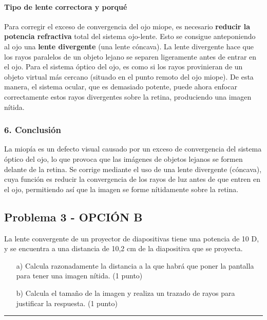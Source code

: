 \paragraph{Tipo de lente correctora y porqué}
Para corregir el exceso de convergencia del ojo miope, es necesario \textbf{reducir la potencia refractiva} total del sistema ojo-lente. Esto se consigue anteponiendo al ojo una \textbf{lente divergente} (una lente cóncava).
La lente divergente hace que los rayos paralelos de un objeto lejano se separen ligeramente antes de entrar en el ojo. Para el sistema óptico del ojo, es como si los rayos provinieran de un objeto virtual más cercano (situado en el punto remoto del ojo miope). De esta manera, el sistema ocular, que es demasiado potente, puede ahora enfocar correctamente estos rayos divergentes sobre la retina, produciendo una imagen nítida.

\subsubsection*{6. Conclusión}
\begin{cajaconclusion}
La miopía es un defecto visual causado por un exceso de convergencia del sistema óptico del ojo, lo que provoca que las imágenes de objetos lejanos se formen delante de la retina. Se corrige mediante el uso de una lente divergente (cóncava), cuya función es reducir la convergencia de los rayos de luz antes de que entren en el ojo, permitiendo así que la imagen se forme nítidamente sobre la retina.
\end{cajaconclusion}

\newpage

\subsection{Problema 3 - OPCIÓN B}
\label{subsec:3B_2018_jun_ord}
\begin{cajaenunciado}
La lente convergente de un proyector de diapositivas tiene una potencia de 10 D, y se encuentra a una distancia de 10,2 cm de la diapositiva que se proyecta.
\begin{itemize}
    \item[a)] Calcula razonadamente la distancia a la que habrá que poner la pantalla para tener una imagen nítida. (1 punto)
    \item[b)] Calcula el tamaño de la imagen y realiza un trazado de rayos para justificar la respuesta. (1 punto)
\end{itemize}
\end{cajaenunciado}
\hrule

